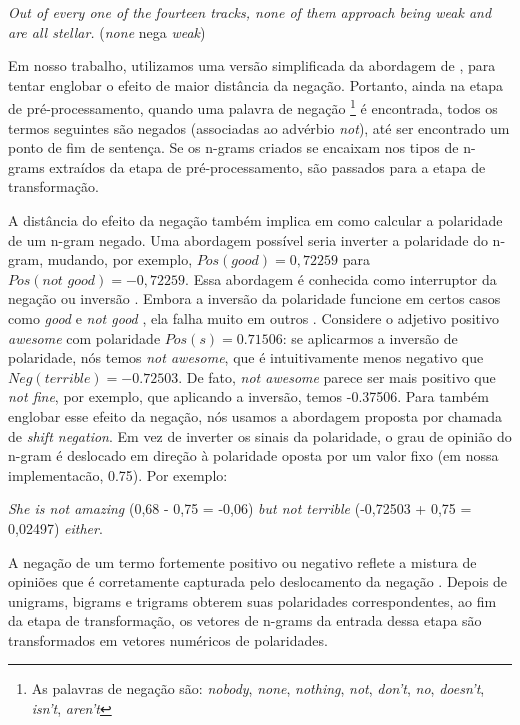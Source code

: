 \begin{example}
\textit{Out of every one of the fourteen tracks, none of them approach being weak and are all stellar.} (\textit{none} nega \textit{weak})
\label{ex:far_neg_2}
\end{example}

Em nosso trabalho, utilizamos uma versão simplificada da abordagem de , para tentar englobar o efeito de maior distância da negação. Portanto, ainda na etapa de pré-processamento, quando uma palavra de negação \footnote{As palavras de negação são: \textit{nobody}, \textit{none}, \textit{nothing}, \textit{not}, \textit{don't}, \textit{no}, \textit{doesn't}, \textit{isn't}, \textit{aren't}} é encontrada, todos os termos seguintes são negados (associadas ao advérbio \textit{not}), até ser encontrado um ponto de fim de sentença. Se os n-grams criados se encaixam nos tipos de n-grams extraídos da etapa de pré-processamento, são passados para a etapa de transformação. 

A distância do efeito da negação também implica em como calcular a polaridade de um n-gram negado.  Uma abordagem possível seria inverter a polaridade do n-gram, mudando, por exemplo, $Pos(\textit{good}) = 0,72259$ para $Pos(\textit{not good}) = - 0,72259$. Essa abordagem é conhecida como interruptor da negação ou inversão \cite{sauri2008factuality}. Embora a inversão da polaridade funcione em certos casos como \textit{good} e \textit{not good} \cite{choi2008learning}, ela falha muito em outros \cite{liu2009review}. Considere o adjetivo positivo \textit{awesome} com polaridade $Pos(s) = 0.71506 $: se aplicarmos a inversão de polaridade, nós temos \textit{not awesome}, que é intuitivamente menos negativo que $Neg(\textit{terrible}) = -0.72503$. De fato, \textit{not awesome} parece ser mais positivo que \textit{not fine}, por exemplo, que aplicando a inversão, temos -0.37506. Para também englobar esse efeito da negação, nós usamos a abordagem proposta por  chamada de \textit{shift negation}. Em vez de inverter os sinais da polaridade, o grau de opinião do n-gram é deslocado em direção à polaridade oposta por um valor fixo (em nossa implementacão, 0.75). Por exemplo:

\begin{example}
\textit{She is not amazing} (0,68 - 0,75 = -0,06) \textit{but not terrible} (-0,72503 + 0,75 = 0,02497) \textit{either}.
\label{ex:shift_1}
\end{example}

A negação de um termo fortemente positivo ou negativo reflete a mistura de opiniões que é corretamente capturada pelo deslocamento da negação \cite{taboada2011lexicon}. Depois de unigrams, bigrams e trigrams obterem suas polaridades correspondentes, ao fim da etapa de transformação, os vetores de n-grams da entrada dessa etapa são transformados em vetores numéricos de polaridades.  

